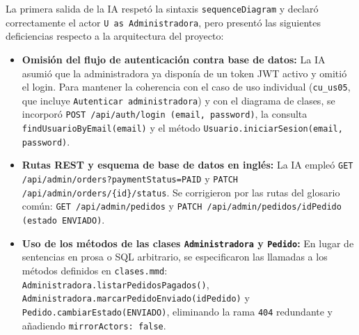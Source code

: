 La primera salida de la IA respetó la sintaxis \texttt{sequenceDiagram} y declaró correctamente el actor \texttt{U as Administradora}, pero presentó las siguientes deficiencias respecto a la arquitectura del proyecto:
\begin{itemize}[leftmargin=*,nosep]
\item \textbf{Omisión del flujo de autenticación contra base de datos:} La IA asumió que la administradora ya disponía de un token JWT activo y omitió el login. Para mantener la coherencia con el caso de uso individual (\texttt{cu\_us05}, que incluye \texttt{Autenticar administradora}) y con el diagrama de clases, se incorporó \texttt{POST /api/auth/login (email, password)}, la consulta \texttt{findUsuarioByEmail(email)} y el método \texttt{Usuario.iniciarSesion(email, password)}.
\item \textbf{Rutas REST y esquema de base de datos en inglés:} La IA empleó \texttt{GET /api/admin/orders?paymentStatus=PAID} y \texttt{PATCH /api/admin/orders/\{id\}/status}. Se corrigieron por las rutas del glosario común: \texttt{GET /api/admin/pedidos} y \texttt{PATCH /api/admin/pedidos/idPedido (estado ENVIADO)}.
\item \textbf{Uso de los métodos de las clases \texttt{Administradora} y \texttt{Pedido}:} En lugar de sentencias en prosa o SQL arbitrario, se especificaron las llamadas a los métodos definidos en \texttt{clases.mmd}: \texttt{Administradora.listarPedidosPagados()}, \texttt{Administradora.marcarPedidoEnviado(idPedido)} y \texttt{Pedido.cambiarEstado(ENVIADO)}, eliminando la rama \texttt{404} redundante y añadiendo \texttt{mirrorActors: false}.
\end{itemize}
